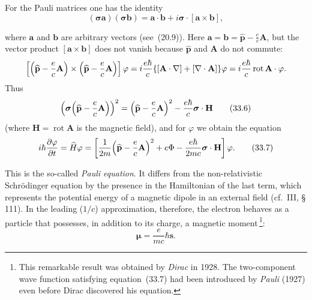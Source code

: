 For the Pauli matrices one has the identity
\begin{equation}
(\boldsymbol{\sigma}\mathbf{a})(\boldsymbol{\sigma}\mathbf{b}) = \mathbf{a}\cdot\mathbf{b} + i\boldsymbol{\sigma}\cdot[\mathbf{a}\times\mathbf{b}],
\tag{33.5}
\end{equation}

where $\mathbf{a}$ and $\mathbf{b}$ are arbitrary vectors (see~(20.9)). Here $\mathbf{a} = \mathbf{b} = \widehat{\mathbf{p}} - \frac{e}{c}\mathbf{A}$, but the vector product $[\mathbf{a}\times\mathbf{b}]$ does not vanish because $\widehat{\mathbf{p}}$ and $\mathbf{A}$ do not commute:
\[
\left[\Bigl(\widehat{\mathbf{p}} - \frac{e}{c}\mathbf{A}\Bigr) \times \Bigl(\widehat{\mathbf{p}} - \frac{e}{c}\mathbf{A}\Bigr)\right]\varphi = i\frac{e\hbar}{c}\{[\mathbf{A}\cdot\nabla] + [\nabla\cdot\mathbf{A}]\}\varphi = i\frac{e\hbar}{c}\operatorname{rot}\mathbf{A}\cdot\varphi.
\]
Thus
\begin{equation}
\Bigl(\boldsymbol{\sigma}\Bigl(\widehat{\mathbf{p}} - \frac{e}{c}\mathbf{A}\Bigr)\Bigr)^2 = \Bigl(\widehat{\mathbf{p}} - \frac{e}{c}\mathbf{A}\Bigr)^2 - \frac{e\hbar}{c}\boldsymbol{\sigma}\cdot\mathbf{H}
\tag{33.6}
\end{equation}
(where $\mathbf{H} = \operatorname{rot}\mathbf{A}$ is the magnetic field), and for $\varphi$ we obtain the equation
\begin{equation}
i\hbar\frac{\partial\varphi}{\partial t} = \widehat H\varphi = \left[\frac{1}{2m}\Bigl(\widehat{\mathbf{p}} - \frac{e}{c}\mathbf{A}\Bigr)^2 + e\Phi - \frac{e\hbar}{2mc}\boldsymbol{\sigma}\cdot\mathbf{H}\right]\varphi.
\tag{33.7}
\end{equation}

This is the so-called \emph{Pauli equation}. It differs from the non-relativistic Schr\"odinger equation by the presence in the Hamiltonian of the last term, which represents the potential energy of a magnetic dipole in an external field (cf.\ III, \S\,111). In the leading ($1/c$) approximation, therefore, the electron behaves as a particle that possesses, in addition to its charge, a magnetic moment\,\footnote{This remarkable result was obtained by \emph{Dirac} in 1928. The two-component wave function satisfying equation~(33.7) had been introduced by \emph{Pauli} (1927) even before Dirac discovered his equation.}:
\begin{equation}
\boldsymbol{\mu} = \frac{e}{mc}\hbar\mathbf{s}.
\tag{33.8}
\end{equation}

